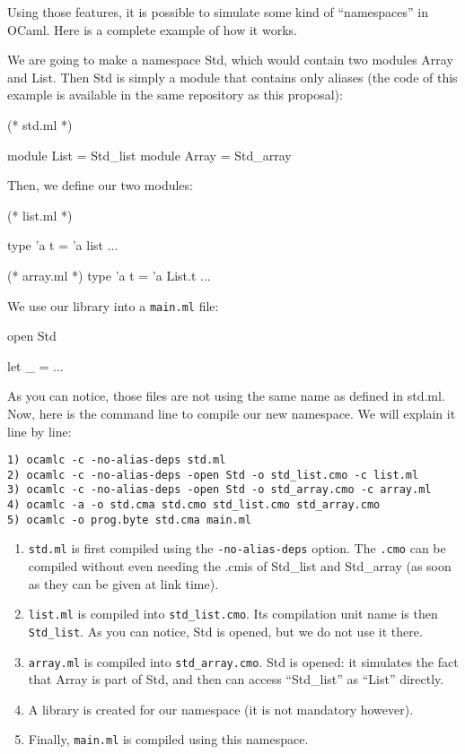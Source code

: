 \documentclass[11pt,a4paper]{article}
\begin{document}
Using those features, it is possible to simulate some kind of ``namespaces'' in
OCaml. Here is a complete example of how it works.

We are going to make a namespace Std, which would contain two modules Array and
List. Then Std is simply a module that contains only aliases (the code of this
example is available in the same repository as this proposal):

\begin{OCaml}
(* std.ml *)

module List = Std_list
module Array = Std_array
\end{OCaml}

Then, we define our two modules:

\begin{OCaml}
(* list.ml *)

type 'a t = 'a list
...

(* array.ml *)
type 'a t = 'a List.t 
...
\end{OCaml}

We use our library into a \texttt{main.ml} file:

\begin{OCaml}
open Std

let _ = ...
\end{OCaml}

As you can notice, those files are not using the same name as defined in
std.ml. Now, here is the command line to compile our new namespace. We will
explain it line by line:

\begin{verbatim}
1) ocamlc -c -no-alias-deps std.ml
2) ocamlc -c -no-alias-deps -open Std -o std_list.cmo -c list.ml
3) ocamlc -c -no-alias-deps -open Std -o std_array.cmo -c array.ml
4) ocamlc -a -o std.cma std.cmo std_list.cmo std_array.cmo
5) ocamlc -o prog.byte std.cma main.ml
\end{verbatim}

\begin{enumerate}
\item \texttt{std.ml} is first compiled using the \texttt{-no-alias-deps}
  option. The \texttt{.cmo} can be compiled without even needing the .cmis of Std\_list
  and Std\_array (as soon as they can be given at link time).
\item \texttt{list.ml} is compiled into \texttt{std\_list.cmo}. Its compilation
  unit name is then \lstinline{Std_list}. As you can notice, Std is opened, but
  we do not use it there.
\item \texttt{array.ml} is compiled into \texttt{std\_array.cmo}. Std is opened:
  it simulates the fact that Array is part of Std, and then can access
  ``Std\_list'' as ``List'' directly.
\item A library is created for our namespace (it is not mandatory however).
\item Finally, \texttt{main.ml} is compiled using this namespace.
\end{enumerate}
\end{document}
